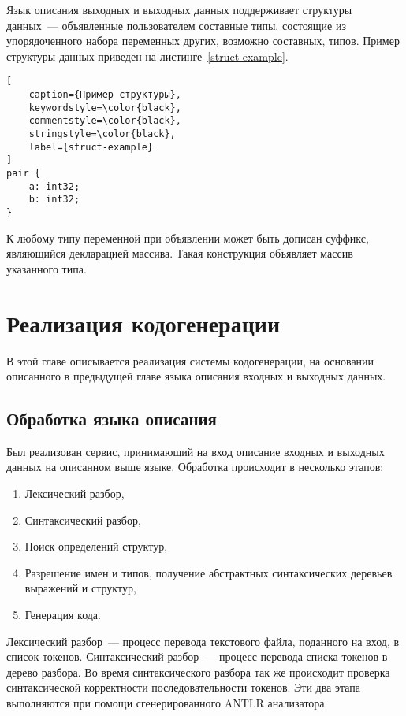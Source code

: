\documentclass[times,specification,annotation]{style/itmo-student-thesis/itmo-student-thesis}
\begin{document}
Язык описания выходных и выходных данных поддерживает структуры данных~--- объявленные пользователем составные типы, состоящие из упорядоченного набора переменных других, возможно составных, типов. Пример структуры данных приведен на листинге~\ref{struct-example}.

\begin{lstlisting}[
    caption={Пример структуры},
    keywordstyle=\color{black},
    commentstyle=\color{black},
    stringstyle=\color{black},
    label={struct-example}
]
pair {
    a: int32;
    b: int32;
}
\end{lstlisting}

К любому типу переменной при объявлении может быть дописан суффикс, являющийся декларацией массива. Такая конструкция объявляет массив указанного типа.

\chapter{Реализация кодогенерации}

В этой главе описывается реализация системы кодогенерации, на основании описанного в предыдущей главе языка описания входных и выходных данных.

\section{Обработка языка описания}

Был реализован сервис, принимающий на вход описание входных и выходных данных на описанном выше языке. Обработка происходит в несколько этапов:

\begin{enumerate}
    \item Лексический разбор,
    \item Синтаксический разбор,
    \item Поиск определений структур,
    \item Разрешение имен и типов, получение абстрактных синтаксических деревьев выражений и структур,
    \item Генерация кода.
\end{enumerate}

Лексический разбор~--- процесс перевода текстового файла, поданного на вход, в список токенов. Синтаксический разбор~--- процесс перевода списка токенов в дерево разбора. Во время синтаксического разбора так же происходит проверка синтаксической корректности последовательности токенов. Эти два этапа выполняются при помощи сгенерированного ANTLR анализатора.
\end{document}
